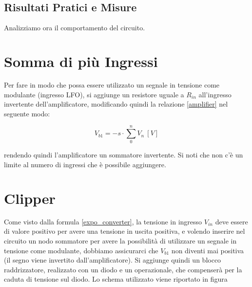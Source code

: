 \subsection*{Risultati Pratici e Misure}


Analizziamo ora il comportamento del circuito.



\section{Somma di più Ingressi}


Per fare in modo che possa essere utilizzato un segnale in tensione come modulante (ingresso
LFO), si aggiunge un resistore uguale a $R_{in}$ all'ingresso invertente dell'amplificatore,
modificando quindi la relazione \ref{amplifier} nel seguente modo:

\begin{equation}
    V_{b1}=-s\cdot\sum_0^n{V_{n}}\ [V]
\end{equation}


rendendo quindi l'amplificatore un sommatore invertente. Si noti che non c'è un limite al
numero di ingressi che è possibile aggiungere.


\section{Clipper}


Come visto dalla formula \ref{expo_converter}, la tensione in ingresso $V_{in}$ deve essere di
valore positivo per avere una tensione in uscita positiva, e volendo inserire nel circuito
un nodo sommatore per avere la possibilità di utilizzare un segnale in tensione come modulante,
dobbiamo assicurarci che $V_{b1}$ non diventi mai positiva (il segno viene invertito
dall'amplificatore). Si aggiunge quindi un blocco raddrizzatore, realizzato con un diodo e
un operazionale, che compenserà per la caduta di tensione sul diodo. Lo schema utilizzato
viene riportato in figura %

